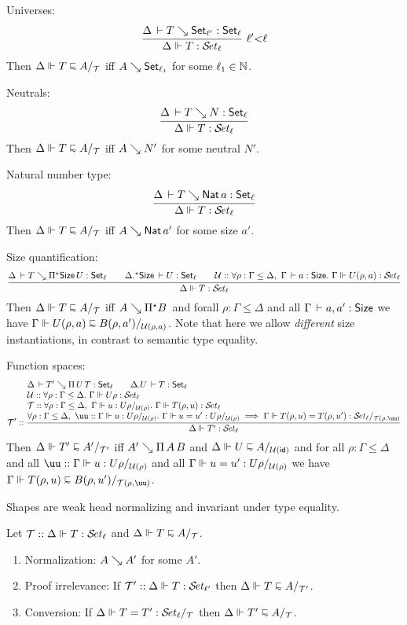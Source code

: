 \documentclass[acmlarge,review,anonymous]{acmart}\settopmatter{printfolios=true}
\begin{document}
\begin{caselist}

\nextcase Universes:
\[
  \rux{\Delta \der T \evalsto \Set[\ell'] : \Set[\ell]
     }{\sty \Delta T \ell
     }{\ell' {<} \ell}
\]
Then $\ssh \Delta T A \T$ iff
$A \evalsto \Set[\ell_1]$ for some $\ell_1 \in \NN$.

\nextcase Neutrals:
\[
  \ru{\Delta \der T \evalsto N : \Set[\ell]
    }{\sty \Delta T \ell}
\]
Then $\ssh \Delta T A \T$ iff
$A \evalsto N'$ for some neutral $N'$.

\nextcase Natural number type:
\[
  \ru{\Delta \der T \evalsto \Nat a : \Set[\ell]
    }{\sty \Delta T \ell}
\]
Then $\ssh \Delta T A \T$ iff
$A \evalsto \Nat a'$ for some size $a'$.

\nextcase Size quantification:
\[
  \rul{\Delta \der T \evalsto \epiT \Size U : \Set[\ell] \qquad
       \eext \Delta \Size \der U : \Set[\ell] \qquad
      \U :: \forall \rho : \Gamma \leq \Delta,~\Gamma \der a : \Size.~
        \sty \Gamma {U(\rho,a)} \ell \\
    }{\sty \Delta {T} \ell}
\]
Then $\ssh \Delta T A \T$ iff $A \evalsto \epiT B$ and
forall $\rho : \Gamma \leq \Delta$ and all $\Gamma \der a,a' : \Size$
we have $\ssh \Gamma {U(\rho,a)} {B(\rho,a')} {\U(\rho,a)}$.
Note that here we allow \emph{different} size instantiations, in
contrast to semantic type equality.

\nextcase Function spaces:
\[
  \T' ::
  \rul{\Delta \der T' \evalsto \piT {U} {T} : \Set[\ell] \qquad \cext \Delta U \der T : \Set[\ell] \\ \relax
      \U :: \forall \rho : \Gamma \leq \Delta.~ \sty{\Gamma}{U\rho} {\ell} \\ \relax
      \T :: \forall \rho : \Gamma \leq \Delta,~\sttmd \Gamma u {U\rho} {\U(\rho)}.~
        \sty \Gamma {T(\rho,u)} \ell \\
      \forall \rho : \Gamma \leq \Delta,~ \uu :: \sttmd \Gamma u {U\rho} {\U(\rho)}.~
        \sttmeqd \Gamma u {u'} {U\rho} {\U(\rho)} {\uu} \implies
        \steqd \Gamma {T(\rho,u)} {T(\rho,u')} \ell {\T(\rho,\uu)}
    }{\sty \Delta {T'} \ell}
\]
Then $\ssh \Delta {T'} {A'} {\T'}$ iff $A' \evalsto \piT A B$ and
$\ssh \Delta U A {\U(\sid)}$ and
for all $\rho : \Gamma \leq \Delta$ and all $\uu :: \sttmd \Gamma u {U\rho} {\U(\rho)}$
and all $\stmeqd \Gamma u {u'} {U\rho} {\U(\rho)}$
we have $\ssh \Gamma {T(\rho,u)} {B(\rho,u')} {\T(\rho,\uu)}$.
\end{caselist}

Shapes are weak head normalizing and invariant under type equality.
\begin{lemma}
  Let $\T :: \sty \Delta T \ell$ and $\ssh \Delta T A \T$.
  \begin{enumerate}
  \item Normalization: $A \evalsto A'$ for some $A'$.
  \item Proof irrelevance: If\/ $\T' :: \sty \Delta T {\ell'}$ then
    $\ssh \Delta T A {\T'}$.
  \item Conversion: If\/ $\steqd \Delta T {T'} \ell \T$ then $\ssh \Delta {T'} A \T$.
  \end{enumerate}
\end{lemma}
\end{document}
